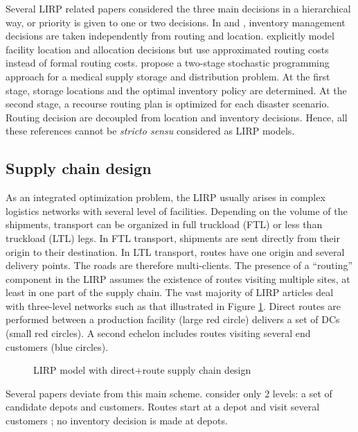 \documentclass[a4paper,10pt]{article}
\begin{document}
\begin{linenumbers}
Several LIRP related papers considered the three main decisions in a hierarchical way, or priority is given to one or two decisions. 
In \cite{LiuLee03} and \cite{LiuLin05}, inventory management decisions are taken independently from routing and location. 
\cite{Shen07} explicitly model facility location and allocation decisions but use approximated routing costs instead of formal routing costs. 
\cite{MetZab10} propose a two-stage stochastic programming approach for a medical supply
storage and distribution problem.
At the first stage, storage locations and the optimal inventory policy are determined. 
At the second stage, a recourse routing plan is optimized for each disaster scenario. 
Routing decision are decoupled from location and inventory decisions. 
Hence, all these references cannot be \textit{stricto sensu} considered as LIRP models. 

\subsection{Supply chain design}
\label{sec:l} 

As an integrated optimization problem, the LIRP usually arises in complex logistics networks with several level of facilities. 
Depending on the volume of the shipments, transport can be organized in full truckload (FTL) or less than truckload (LTL) legs. 
In FTL transport, shipments are sent directly from their origin to their destination. In LTL transport, routes have one origin and several delivery points. The roads are therefore multi-clients. The presence of a ``routing'' component in the LIRP assumes the existence of routes visiting multiple sites, at least in one part of the supply chain.
The vast majority of LIRP articles deal with three-level networks such as that illustrated in Figure \ref{fig:directloop}. 
Direct routes are performed between a production facility (large red circle) delivers a set of DCs (small red circles). A second echelon includes routes visiting several end customers (blue circles).

\begin{figure}[htbp]
	\centering
	\caption{LIRP model with direct+route supply chain design}
		\label{fig:directloop}
	\end{figure}

Several papers deviate from this main scheme.  \cite{Zhang2014} consider only 2 levels: a set of candidate depots and customers. Routes start at a depot and visit several customers ; no inventory decision is made at depots. 


\end{linenumbers}
\end{document}
